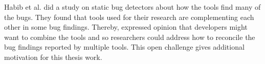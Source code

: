 Habib et al. \cite{habib} did a study on static bug detectors about how the tools find many of the bugs. They found that tools used for their research are complementing each other in some bug findings.  Thereby, expressed opinion that developers might want to combine the tools and so researchers could address how to reconcile the bug findings reported by multiple tools. This open challenge gives additional motivation for this thesis work. \\
